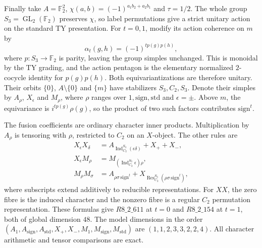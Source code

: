 \documentclass[11pt,reqno]{amsart}
\theoremstyle{definition}
\theoremstyle{remark}
\begin{document}
Finally take $A=\mathbb F_2^2$, $\chi(a,b)=(-1)^{a_1b_2+a_2b_1}$ and $\tau=1/2$. The whole group $S_3=\operatorname{GL}_2(\mathbb F_2)$ preserves $\chi$, so label permutations give a strict unitary action on the standard TY presentation. For $t=0,1$, modify its action coherence on $m$ by
\[
\alpha_t(g,h)=(-1)^{t p(g)p(h)},
\]
where $p:S_3\to\mathbb F_2$ is parity, leaving the group simples unchanged. This is monoidal by the TY grading, and the action pentagon is the elementary normalized $2$-cocycle identity for $p(g)p(h)$. Both equivariantizations are therefore unitary. Their orbits $\{0\}$, $A\setminus\{0\}$ and $\{m\}$ have stabilizers $S_3,C_2,S_3$. Denote their simples by $A_\rho$, $X_\epsilon$ and $M_\rho$, where $\rho$ ranges over $1,\mathrm{sign},\mathrm{std}$ and $\epsilon=\pm$. Above $m$, the equivariance is $i^{tp(g)}\rho(g)$, so the product of two such factors contributes $\mathrm{sign}^t$.

The fusion coefficients are ordinary character inner products. Multiplication by $A_\rho$ is tensoring with $\rho$, restricted to $C_2$ on an $X$-object. The other rules are
\[
\begin{split}
X_\epsilon X_\delta&=A_{\operatorname{Ind}_{C_2}^{S_3}(\epsilon\delta)}+X_++X_-,\\
X_\epsilon M_\rho&=M_{(\operatorname{Ind}_{C_2}^{S_3}\epsilon)\rho},\\
M_\rho M_\sigma&=A_{\rho\sigma\,\mathrm{sign}^t}
 +X_{\operatorname{Res}_{C_2}^{S_3}(\rho\sigma\,\mathrm{sign}^t)},
\end{split}
\]
where subscripts extend additively to reducible representations. For $X X$, the zero fibre is the induced character and the nonzero fibre is a regular $C_2$ permutation representation. These formulas give $R8\_2\_611$ at $t=0$ and $R8\_2\_154$ at $t=1$, both of global dimension $48$. The model dimensions in the order $(A_1,A_{\mathrm{sign}},A_{\mathrm{std}},X_+,X_-,M_1,M_{\mathrm{sign}},M_{\mathrm{std}})$ are $(1,1,2,3,3,2,2,4)$. All character arithmetic and tensor comparisons are exact.
\end{document}
